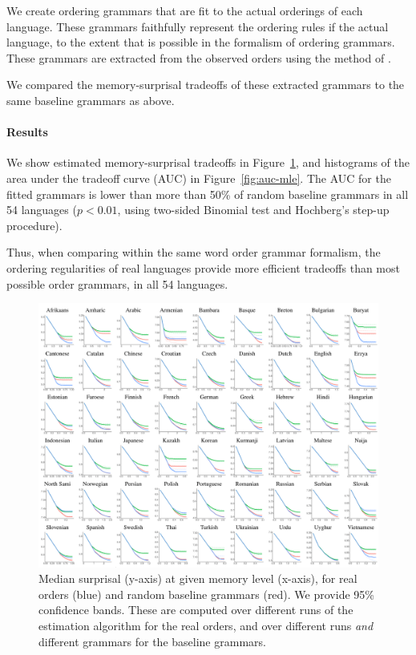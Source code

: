 We create ordering grammars that are fit to the actual orderings of each language.
These grammars faithfully represent the ordering rules if the actual language, to the extent that is possible in the formalism of ordering grammars.
These grammars are extracted from the observed orders using the method of \cite{hahn2020optimization}.

We compared the memory-surprisal tradeoffs of these extracted grammars to the same baseline grammars as above.


\paragraph{Results}


We show estimated memory-surprisal tradeoffs in Figure~\ref{fig:median-table}, and histograms of the area under the tradeoff curve (AUC) in Figure~\ref{fig:auc-mle}.
The AUC for the fitted grammars is lower than more than 50\% of random baseline grammars in all 54 languages ($p < 0.01$, using two-sided Binomial test and Hochberg's step-up procedure).

Thus, when comparing within the same word order grammar formalism, the ordering regularities of real languages provide more efficient tradeoffs than most possible order grammars, in all 54 languages.

\begin{figure}
	\begin{center}
\includegraphics[width=\textwidth]{results-table-mle.pdf}
\end{center}
	\caption{Median surprisal (y-axis) at given memory level (x-axis), for real orders (blue) and random baseline grammars (red). We provide 95\% confidence bands. These are computed over different runs of the estimation algorithm for the real orders, and over different runs \emph{and} different grammars for the baseline grammars. }\label{fig:median-table}
\end{figure}



